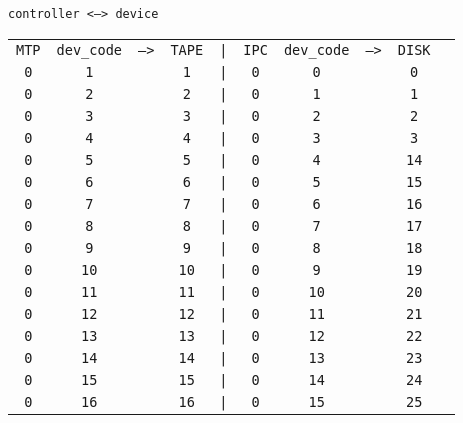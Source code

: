 \newpage
\begin{center}
    \texttt{controller <--> device}
	\begin{tabular}{cccccccccc}
		\texttt{MTP} & \texttt{dev\_code} & \texttt{-->} & \texttt{TAPE} & \texttt{|} & \texttt{IPC} & \texttt{dev\_code} & \texttt{-->} & \texttt{DISK} \\
		\texttt{0} & \texttt{1} & & \texttt{1} & \texttt{|} & \texttt{0} & \texttt{0} & & \texttt{0} \\
		\texttt{0} & \texttt{2} & & \texttt{2} & \texttt{|} & \texttt{0} & \texttt{1} & & \texttt{1}  \\
		\texttt{0} & \texttt{3} & & \texttt{3} & \texttt{|} & \texttt{0} & \texttt{2} & & \texttt{2} \\
		\texttt{0} & \texttt{4} & & \texttt{4} & \texttt{|} & \texttt{0} & \texttt{3} & & \texttt{3} \\
		\texttt{0} & \texttt{5} & & \texttt{5} & \texttt{|} & \texttt{0} & \texttt{4} & & \texttt{14} \\
		\texttt{0} & \texttt{6} & & \texttt{6} & \texttt{|} & \texttt{0} & \texttt{5} & & \texttt{15} \\
		\texttt{0} & \texttt{7} & & \texttt{7} & \texttt{|} & \texttt{0} & \texttt{6} & & \texttt{16} \\
		\texttt{0} & \texttt{8} & & \texttt{8} & \texttt{|} & \texttt{0} & \texttt{7} & & \texttt{17} \\
		\texttt{0} & \texttt{9} & & \texttt{9} & \texttt{|} & \texttt{0} & \texttt{8} & & \texttt{18} \\
		\texttt{0} & \texttt{10} & & \texttt{10} & \texttt{|} & \texttt{0} & \texttt{9} & & \texttt{19} \\
		\texttt{0} & \texttt{11} & & \texttt{11} & \texttt{|} & \texttt{0} & \texttt{10} & & \texttt{20} \\
		\texttt{0} & \texttt{12} & & \texttt{12} & \texttt{|} & \texttt{0} & \texttt{11} & & \texttt{21} \\
		\texttt{0} & \texttt{13} & & \texttt{13} & \texttt{|} & \texttt{0} & \texttt{12} & & \texttt{22} \\
		\texttt{0} & \texttt{14} & & \texttt{14} & \texttt{|} & \texttt{0} & \texttt{13} & & \texttt{23} \\
		\texttt{0} & \texttt{15} & & \texttt{15} & \texttt{|} & \texttt{0} & \texttt{14} & & \texttt{24} \\
		\texttt{0} & \texttt{16} & & \texttt{16} & \texttt{|} & \texttt{0} & \texttt{15} & & \texttt{25} \\
    \end{tabular}


\end{center}
